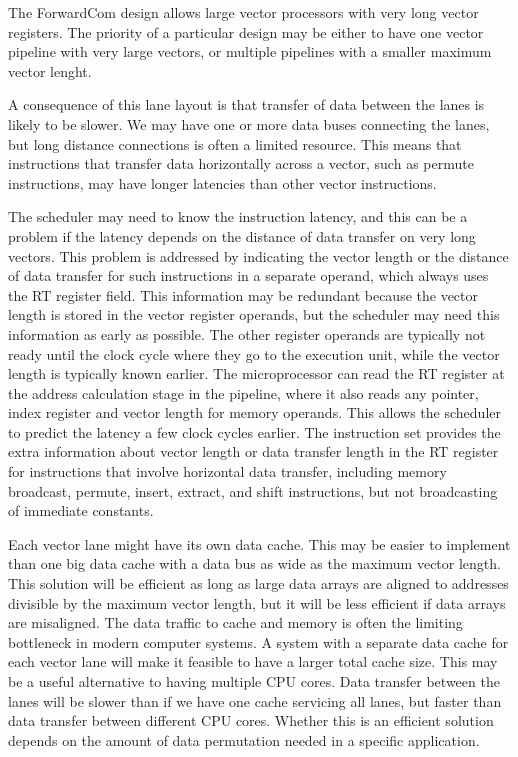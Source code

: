 \documentclass[forwardcom.tex]{subfiles}
\begin{document}
The ForwardCom design allows large vector processors with very long vector registers. The priority of a particular design may be either to have one vector pipeline with very large vectors, or multiple pipelines with a smaller maximum vector lenght.
\vv

A consequence of this lane layout is that transfer of data between the lanes is likely to be slower. We may have one or more data buses connecting the lanes, but long distance connections is often a limited resource.
This means that instructions that transfer data horizontally across a vector, such as permute instructions, may have longer latencies than other vector instructions. 
\vv

The scheduler may need to know the instruction latency, and this can be a problem if the latency depends on the distance of data transfer on very long vectors. This problem is addressed by indicating the vector length or the distance of data transfer for such instructions in a separate operand, which always uses the RT register field. This information may be redundant because the vector length is stored in the vector register operands, but the scheduler may need this information as early as possible. The other register operands are typically not ready until the clock cycle where they go to the execution unit, while the vector length is typically known earlier. The microprocessor can read the RT register at the address calculation stage in the pipeline, where it also reads any pointer, index register and vector length for memory operands. This allows the scheduler to predict the latency a few clock cycles earlier. The instruction set provides the extra information about vector length or data transfer length in the RT register for instructions that involve horizontal data transfer, including memory broadcast, permute, insert, extract, and shift instructions, but not broadcasting of immediate constants. 
\vv

Each vector lane might have its own data cache. This may be easier to implement than one big data cache with a data bus as wide as the maximum vector length. This solution will be efficient as long as large data arrays are aligned to addresses divisible by the maximum vector length, but it will be less efficient if data arrays are misaligned. 
The data traffic to cache and memory is often the limiting bottleneck in modern computer systems. A system with a separate data cache for each vector lane will make it feasible to have a larger total cache size. This may be a useful alternative to having multiple CPU cores. Data transfer between the lanes will be slower than if we have one cache servicing all lanes, but faster than data transfer between different CPU cores. Whether this is an efficient solution depends on the amount of data permutation needed in a specific application.
\vv
\end{document}
